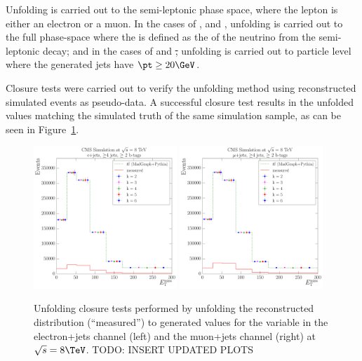 Unfolding is carried out to the semi-leptonic phase space, where the lepton is either an electron or a muon.
In the cases of \met, \wpt and \mt, unfolding is carried out to the full phase-space where the \met is defined
as the \pt of the neutrino from the semi-leptonic decay; and in the cases of \HT and \st, unfolding is carried
out to particle level where the generated jets have $\pt\geq20\GeV$.

Closure tests were carried out to verify the unfolding method using reconstructed simulated events as
pseudo-data. A successful closure test results in the unfolded values matching the simulated truth of the same
simulation sample, as can be seen in Figure~\ref{fig:unfolding_closure_tests}.

\begin{figure}[hbtp]
    \centering
     \includegraphics[width=0.48\textwidth]{Chapters/04_Analysis/04b_XSections/images/unfolding_tests/8TeV/closure/electron_MET_RooUnfoldSvd_closure.pdf}\hfill
     \includegraphics[width=0.48\textwidth]{Chapters/04_Analysis/04b_XSections/images/unfolding_tests/8TeV/closure/muon_MET_RooUnfoldSvd_closure.pdf}\\
	 \caption{Unfolding closure tests performed by unfolding the reconstructed \MADGRAPH distribution
	 (``measured'') to generated values for the \met variable in the electron+jets channel (left) and the
	 muon+jets channel (right) at $\sqrt{s}=8\TeV$. TODO: INSERT UPDATED PLOTS} %
     \label{fig:unfolding_closure_tests}
\end{figure}

